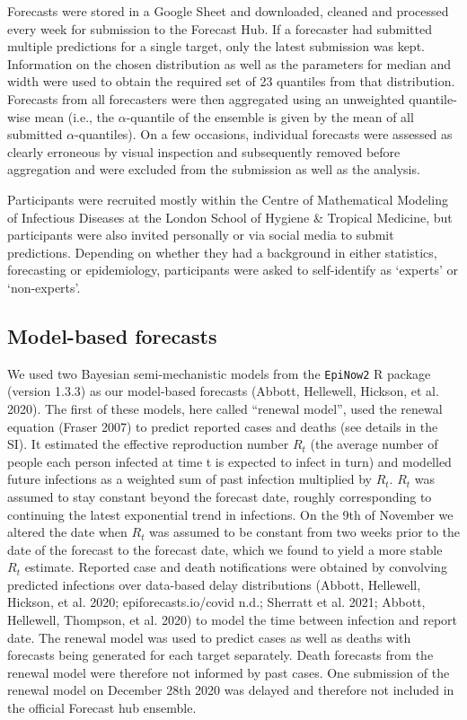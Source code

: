 \documentclass[
]{article}
\begin{document}
Forecasts were stored in a Google Sheet and downloaded, cleaned and processed every week for submission to the Forecast Hub. If a forecaster had submitted multiple predictions for a single target, only the latest submission was kept. Information on the chosen distribution as well as the parameters for median and width were used to obtain the required set of 23 quantiles from that distribution. Forecasts from all forecasters were then aggregated using an unweighted quantile-wise mean (i.e., the \(\alpha\)-quantile of the ensemble is given by the mean of all submitted \(\alpha\)-quantiles). On a few occasions, individual forecasts were assessed as clearly erroneous by visual inspection and subsequently removed before aggregation and were excluded from the submission as well as the analysis.

Participants were recruited mostly within the Centre of Mathematical Modeling of Infectious Diseases at the London School of Hygiene \& Tropical Medicine, but participants were also invited personally or via social media to submit predictions. Depending on whether they had a background in either statistics, forecasting or epidemiology, participants were asked to self-identify as `experts' or `non-experts'.

\hypertarget{model-based-forecasts}{%
\subsection{Model-based forecasts}\label{model-based-forecasts}}

We used two Bayesian semi-mechanistic models from the \texttt{EpiNow2} R package (version 1.3.3) as our model-based forecasts (Abbott, Hellewell, Hickson, et al. 2020). The first of these models, here called ``renewal model'', used the renewal equation (Fraser 2007) to predict reported cases and deaths (see details in the SI). It estimated the effective reproduction number \(R_t\) (the average number of people each person infected at time t is expected to infect in turn) and modelled future infections as a weighted sum of past infection multiplied by \(R_t\). \(R_t\) was assumed to stay constant beyond the forecast date, roughly corresponding to continuing the latest exponential trend in infections. On the 9th of November we altered the date when \(R_t\) was assumed to be constant from two weeks prior to the date of the forecast to the forecast date, which we found to yield a more stable \(R_t\) estimate. Reported case and death notifications were obtained by convolving predicted infections over data-based delay distributions (Abbott, Hellewell, Hickson, et al. 2020; epiforecasts.io/covid n.d.; Sherratt et al. 2021; Abbott, Hellewell, Thompson, et al. 2020) to model the time between infection and report date. The renewal model was used to predict cases as well as deaths with forecasts being generated for each target separately. Death forecasts from the renewal model were therefore not informed by past cases. One submission of the renewal model on December 28th 2020 was delayed and therefore not included in the official Forecast hub ensemble.
\end{document}
